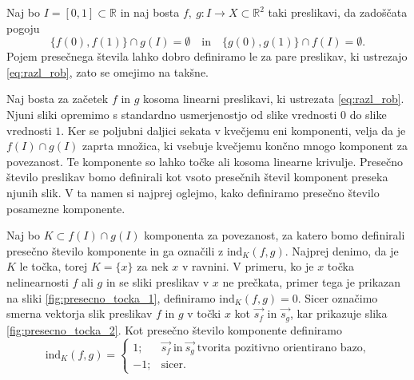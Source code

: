 \documentclass[mat1]{fmfdelo}
\newcommand{\R}{\mathbb R}
\newcommand{\ind}[3][]{\text{ind}_{#1}(#2, #3)}
\begin{document}
Naj bo $I = [0, 1] \subset \R$ in naj bosta $f,\ g \colon I \to X \subset \R^2$ taki preslikavi, da zadoščata pogoju
\begin{equation}\label{eq:razl_rob}
\{f(0), f(1)\} \cap g(I) = \emptyset \quad \text{in} \quad \{g(0), g(1)\} \cap f(I) = \emptyset.
\end{equation}
Pojem presečnega števila lahko dobro definiramo le za pare preslikav, ki ustrezajo \eqref{eq:razl_rob}, zato se omejimo na takšne.

Naj bosta za začetek $f$ in $g$ kosoma linearni preslikavi, ki ustrezata \eqref{eq:razl_rob}. Njuni sliki opremimo s standardno usmerjenostjo od slike vrednosti $0$ do slike vrednosti $1$. Ker se poljubni daljici sekata v kvečjemu eni komponenti, velja da je $f(I) \cap g(I)$ zaprta množica, ki vsebuje kvečjemu končno mnogo komponent za povezanost. Te komponente so lahko točke ali kosoma linearne krivulje. Presečno število preslikav bomo definirali kot vsoto presečnih števil komponent preseka njunih slik. V ta namen si najprej oglejmo, kako definiramo presečno število posamezne komponente.

Naj bo $K \subset f(I) \cap g(I)$ komponenta za povezanost, za katero bomo definirali presečno število komponente in ga označili z $\ind[K]{f}{g}$. Najprej denimo, da je $K$ le točka, torej $K = \{x\}$ za nek $x$ v ravnini. V primeru, ko je $x$ točka nelinearnosti $f$ ali $g$ in se sliki preslikav v $x$ ne prečkata, primer tega je prikazan na sliki \ref{fig:presecno_tocka_1}, definiramo $\ind[K]{f}{g} = 0.$ Sicer označimo smerna vektorja slik preslikav $f$ in $g$ v točki $x$ kot $\overrightarrow{s_f}$ in $\overrightarrow{s_g}$, kar prikazuje slika \ref{fig:presecno_tocka_2}. Kot presečno število komponente definiramo
\begin{equation*}
\ind[K]{f}{g} = \begin{cases}
1; & \overrightarrow{s_f}\ \text{in}\ \overrightarrow{s_g}\ \text{tvorita pozitivno orientirano bazo,}\\
-1; &\text{sicer}.
\end{cases}
\end{equation*}
\end{document}

